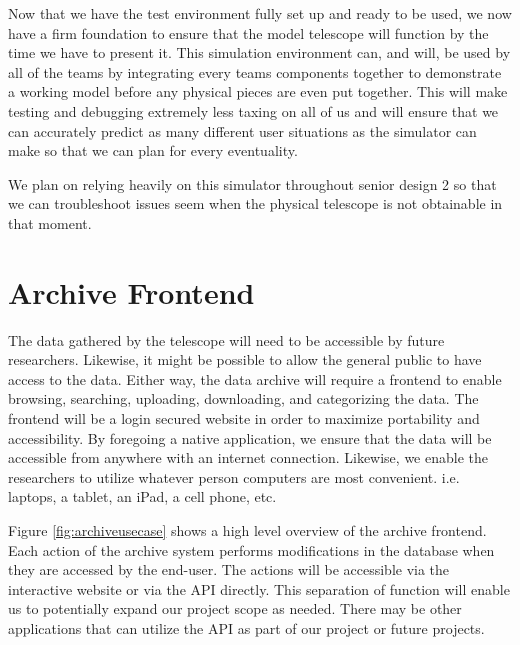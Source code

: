 \documentclass[12pt]{report}
\begin{document}
Now that we have the test environment fully set up and ready to be used, we now have a firm foundation to ensure that the model telescope will function by the time we have to present it. This simulation environment can, and will, be used by all of the teams by integrating every teams components together to demonstrate a working model before any physical pieces are even put together. This will make testing and debugging extremely less taxing on all of us and will ensure that we can accurately predict as many different user situations as the simulator can make so that we can plan for every eventuality.   

We plan on relying heavily on this simulator throughout senior design 2 so that we can troubleshoot issues seem when the physical telescope is not obtainable in that moment.

\section*{Archive Frontend}

The data gathered by the telescope will need to be accessible by future researchers. Likewise, it might be possible to allow the general public to have access to the data. Either way, the data archive will require a frontend to enable browsing, searching, uploading, downloading, and categorizing the data. The frontend will be a login secured website in order to maximize portability and accessibility. By foregoing a native application, we ensure that the data will be accessible from anywhere with an internet connection. Likewise, we enable the researchers to utilize whatever person computers are most convenient. i.e. laptops, a tablet, an iPad, a cell phone, etc.

Figure \ref{fig:archiveusecase} shows a high level overview of the archive frontend. Each action of the archive system performs modifications in the database when they are accessed by the end-user. The actions will be accessible via the interactive website or via the API directly. This separation of function will enable us to potentially expand our project scope as needed. There may be other applications that can utilize the API as part of our project or future projects.
\end{document}
